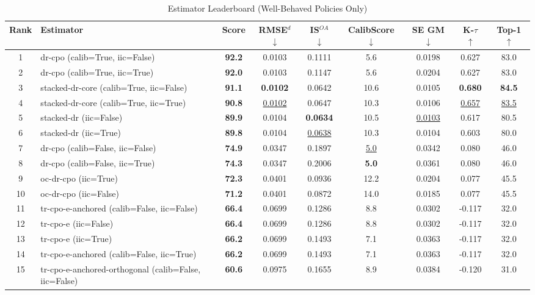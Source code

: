 \begin{table}[htbp]
\centering
\caption{Estimator Leaderboard (Well-Behaved Policies Only)}
\label{tab:leaderboard}
\begin{tabular}{cl|c|cccccc}
\toprule
Rank & Estimator & Score & RMSE$^d$ $\downarrow$ & IS$^{OA}$ $\downarrow$ & CalibScore $\downarrow$ & SE GM $\downarrow$ & K-$\tau$ $\uparrow$ & Top-1 $\uparrow$ \\
\midrule
1 & dr-cpo (calib=True, iic=False) & \textbf{92.2} & 0.0103 & 0.1111 & 5.6 & 0.0198 & 0.627 & 83.0 \\
2 & dr-cpo (calib=True, iic=True) & \textbf{92.0} & 0.0103 & 0.1147 & 5.6 & 0.0204 & 0.627 & 83.0 \\
3 & stacked-dr-core (calib=True, iic=False) & \textbf{91.1} & \textbf{0.0102} & 0.0642 & 10.6 & 0.0105 & \textbf{0.680} & \textbf{84.5} \\
4 & stacked-dr-core (calib=True, iic=True) & \textbf{90.8} & \underline{0.0102} & 0.0647 & 10.3 & 0.0106 & \underline{0.657} & \underline{83.5} \\
5 & stacked-dr (iic=False) & \textbf{89.9} & 0.0104 & \textbf{0.0634} & 10.5 & \underline{0.0103} & 0.617 & 80.5 \\
6 & stacked-dr (iic=True) & \textbf{89.8} & 0.0104 & \underline{0.0638} & 10.3 & 0.0104 & 0.603 & 80.0 \\
7 & dr-cpo (calib=False, iic=False) & \textbf{74.9} & 0.0347 & 0.1897 & \underline{5.0} & 0.0342 & 0.080 & 46.0 \\
8 & dr-cpo (calib=False, iic=True) & \textbf{74.3} & 0.0347 & 0.2006 & \textbf{5.0} & 0.0361 & 0.080 & 46.0 \\
9 & oc-dr-cpo (iic=True) & \textbf{72.3} & 0.0401 & 0.0936 & 12.2 & 0.0204 & 0.077 & 45.5 \\
10 & oc-dr-cpo (iic=False) & \textbf{71.2} & 0.0401 & 0.0872 & 14.0 & 0.0185 & 0.077 & 45.5 \\
11 & tr-cpo-e-anchored (calib=False, iic=False) & \textbf{66.4} & 0.0699 & 0.1286 & 8.8 & 0.0302 & -0.117 & 32.0 \\
12 & tr-cpo-e (iic=False) & \textbf{66.4} & 0.0699 & 0.1286 & 8.8 & 0.0302 & -0.117 & 32.0 \\
13 & tr-cpo-e (iic=True) & \textbf{66.2} & 0.0699 & 0.1493 & 7.1 & 0.0363 & -0.117 & 32.0 \\
14 & tr-cpo-e-anchored (calib=False, iic=True) & \textbf{66.2} & 0.0699 & 0.1493 & 7.1 & 0.0363 & -0.117 & 32.0 \\
15 & tr-cpo-e-anchored-orthogonal (calib=False, iic=False) & \textbf{60.6} & 0.0975 & 0.1655 & 8.9 & 0.0384 & -0.120 & 31.0 \\

\end{tabular}
\end{table}
